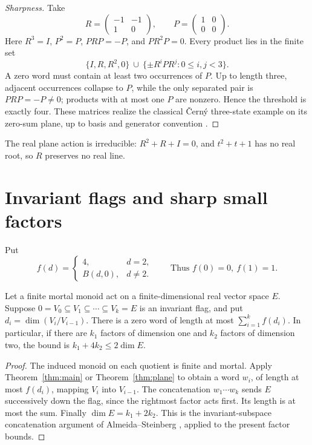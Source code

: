 \begin{proof}[Sharpness]
Take
\[
 R=\begin{pmatrix}-1&-1\\1&0\end{pmatrix},\qquad
 P=\begin{pmatrix}1&0\\0&0\end{pmatrix}.
\]
Here \(R^3=I\), \(P^2=P\), \(PRP=-P\), and \(PR^2P=0\). Every product lies in the finite set
\[
 \{I,R,R^2,0\}\ \cup\ \{\pm R^iPR^j:0\leq i,j<3\}.
\]
A zero word must contain at least two occurrences of \(P\). Up to length three, adjacent occurrences collapse to \(P\), while the only separated pair is \(PRP=-P\ne0\); products with at most one \(P\) are nonzero. Hence the threshold is exactly four. These matrices realize the classical \v Cern\'y three-state example on its zero-sum plane, up to basis and generator convention \cite{Cerny1964}.
\end{proof}
The real plane action is irreducible: \(R^2+R+I=0\), and \(t^2+t+1\) has no real root, so \(R\) preserves no real line.

\section{Invariant flags and sharp small factors}\label{sec:flags}
Put
\[
 f(d)=\begin{cases}4,&d=2,\\ B(d,0),&d\ne2.\end{cases}
 \qquad\text{Thus }f(0)=0,\ f(1)=1.
\]
\begin{theorem}\label{thm:flag}
Let a finite mortal monoid act on a finite-dimensional real vector space \(E\). Suppose
\(0=V_0\subseteq V_1\subseteq\cdots\subseteq V_k=E\)
is an invariant flag, and put \(d_i=\dim(V_i/V_{i-1})\). There is a zero word of length at most \(\sum_{i=1}^k f(d_i)\). In particular, if there are \(k_1\) factors of dimension one and \(k_2\) factors of dimension two, the bound is \(k_1+4k_2\leq2\dim E\).
\end{theorem}
\begin{proof}
The induced monoid on each quotient is finite and mortal. Apply Theorem~\ref{thm:main} or Theorem~\ref{thm:plane} to obtain a word \(w_i\), of length at most \(f(d_i)\), mapping \(V_i\) into \(V_{i-1}\). The concatenation \(w_1\cdots w_k\) sends \(E\) successively down the flag, since the rightmost factor acts first. Its length is at most the sum. Finally \(\dim E=k_1+2k_2\). This is the invariant-subspace concatenation argument of Almeida--Steinberg \cite[Lemma 2.4 and Proposition 2.5]{AS2009}, applied to the present factor bounds.
\end{proof}

